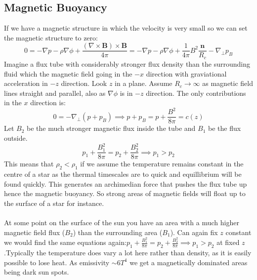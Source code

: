 \documentclass{article}
\begin{document}
\subsection{Magnetic Buoyancy}
If we have a magnetic structure in which the velocity is very small so we can set the magnetic structure to zero:
$$
0 = - \nabla p - \rho \nabla \phi + \frac{(\nabla \times \bm B) \times \bm B}{4 \pi} = -\nabla p - \rho \nabla \phi + \frac{1}{4\pi} B^2 \frac{\bm n}{R_c} - \nabla_{\perp}p_B
$$
Imagine a flux tube with considerably stronger flux density than the surrounding fluid which the magnetic field going in the $-x$ direction with graviational acceleration in $-z$ direction. Look $z$ in a plane. Assume $R_c \rightarrow \infty$ as magnetic field lines straight and parallel, also as $\nabla \phi$ is in $-z$ direction. The only contributions in the $x$ direction is: 
$$
0 = - \nabla_{\perp} (p+p_B) \implies p+p_B = p + \frac{B^2}{8\pi}= c(z)
$$
Let $B_2$ be the much stronger magnetic flux inside the tube and $B_1$ be the flux outside.
$$
 p_1 + \frac{B_1^2}{8\pi} =  p_2 + \frac{B_2^2}{8\pi} \implies p_1 > p_2
 $$
 This means that $\rho_2 < \rho_1$ if we assume the temperature remains constant in the centre of a star as the thermal timescales are to quick and equillibrium will be found quickly. This generates an archimedian force that pushes the flux tube up hence the magnetic buoyancy. So strong areas of magnetic fields will float up to the surface of a star for instance. \\
\\
At some point on the surface of the sun you have an area with a much higher magnetic field flux ($B_2$) than the surrounding area ($B_1$). Can again fix $z$ constant we would find the same equations again:$p_1 + \frac{B_1^2}{8\pi} =  p_2 + \frac{B_2^2}{8\pi} \implies p_1 > p_2$ at fixed $z$.Typically the temperature does vary a lot here rather than density, as it is easily possible to lose heat. As emissivity $\sim 6T^4$ we get a magnetically dominated areas being dark sun spots.
\end{document}
